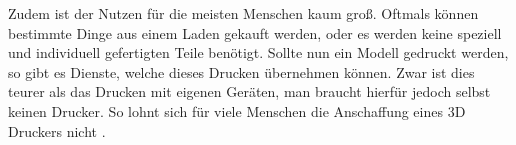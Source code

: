 Zudem ist der Nutzen für die meisten Menschen kaum groß. Oftmals können bestimmte Dinge aus einem Laden gekauft werden, oder es werden keine speziell und individuell gefertigten Teile benötigt. Sollte nun ein Modell gedruckt werden, so gibt es Dienste, welche dieses Drucken übernehmen können. Zwar ist dies teurer als das Drucken mit eigenen Geräten, man braucht hierfür jedoch selbst keinen Drucker. So lohnt sich für viele Menschen die Anschaffung eines 3D Druckers nicht \parencite[Informationen aus:][]{PRIV_USE}.
